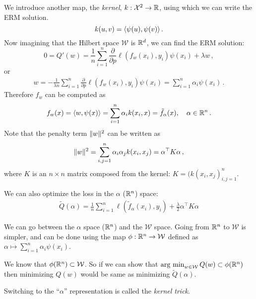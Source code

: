 \documentclass[twoside]{article}
\newcommand{\cW}{\mathcal{W}}
\begin{document}
We introduce another map, the \emph{kernel}, $k:\mathcal{X}^2 \to \mathbb{R}$, using which we can write the ERM solution.
\[
    k(u,v) = \langle \psi(u), \psi(v) \rangle\,.
\]
Now imagining that the Hilbert space $\cW$ is $\mathbb{R}^d$, we can find the ERM solution:
\[
    0 = Q'(w) = \frac1n \sum_{i=1}^n \frac{\partial }{\partial p} \ell(f_w(x_i), y_i) \psi(x_i) + \lambda w \,,
\]
or
\begin{align*}
    w  =  - \frac{1}{\lambda n} \sum_{i=1}^n \frac{\partial }{\partial p} \ell(f_w(x_i), y_i) \psi(x_i) = \sum_{i=1}^n \alpha_i \psi(x_i) \,.
\end{align*}
Therefore $f_w$ can be computed as
\begin{align*}
    f_w(x) = \langle w, \psi(x) \rangle = \sum_{i=1}^n \alpha_i k(x_i, x) = \tilde f_\alpha(x), \quad \alpha \in \mathbb{R}^n\,.
\end{align*}
Note that the penalty term $\|w\|^2$ can be written as
\[
    \|w\|^2 = \sum_{i, j=1}^n \alpha_i \alpha_j k(x_i, x_j) = \alpha^\top K \alpha\,,
\]
where $K$ is an $n \times n$ matrix composed from the kernel: $K = (k(x_i, x_j)_{i,j=1}^n$.

We can also optimize the loss in the $\alpha$ ($\mathbb{R}^n$) space:
\begin{align*}\label{eq:loss-alpha}
    \tilde Q(\alpha) = \frac1n \sum_{i=1}^n \ell(\tilde f_\alpha(x_i), y_i) + \frac\lambda2 \alpha^\top K \alpha
\end{align*}

We can go between the $\alpha$ space ($\mathbb{R}^n$) and the $\cW$ space. Going from $\mathbb{R}^n$ to $\cW$ is simpler, and can be done using the map $\phi: \R^n \to \cW$ defined as $\alpha \mapsto \sum_{i=1}^n \alpha_i \psi(x_i)$. 



We know that $\phi(\R^n) \subset \cW$. So if we can show that $\argmin_{w \in \cW} Q(w) \subset \phi(\R^n)$ then minimizing $Q(w)$ would be same as minimizing $\tilde Q(\alpha)$. 


Switching to the ``$\alpha$'' representation is called the \emph{kernel trick}. 
\end{document}
